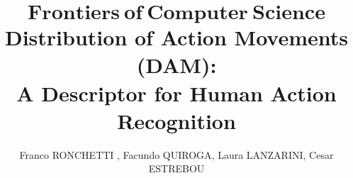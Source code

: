 \documentclass{fcs}
\title{$\bm{Frontiers~ of~ Computer~ Science}$\\[2mm] Distribution of Action Movements (DAM): \\A Descriptor for Human Action Recognition}
\author{Franco RONCHETTI \xff, Facundo QUIROGA, Laura LANZARINI, Cesar ESTREBOU}
\begin{document}
\maketitle
\setcounter{page}{1}
\setlength{\baselineskip}{14pt}


\newcommand{\as}{\mathcal{A}}

\newcommand{\ac}{\mathbf{A}}
\newcommand{\afj}{\mathbf{A}_{f,j}}
\newcommand{\aj}{\mathbf{A}_j}
\newcommand{\af}{\mathbf{A}_f}
\newcommand{\ai}{\mathbf{A}^i}
\newcommand{\aifj}{\mathbf{A}_{f,j}^i}
\newcommand{\aifjp}{\mathbf{A}_{f+1,j}^i}
\newcommand{\aifp}{\mathbf{A}_{f+1}^i}
\newcommand{\aij}{\mathbf{A}_j^i}
\newcommand{\aif}{\mathbf{A}_f^i}

\newcommand{\fri}{F_i}

\newcommand{\dc}{\mathbf{D}}
\newcommand{\dcj}{\mathbf{D}_j}
\newcommand{\df}{\mathbf{D}_f}
\newcommand{\dfj}{\mathbf{D}_{f,j}}

\newcommand{\di}{\mathbf{D}^i}
\newcommand{\dij}{\mathbf{D}_j^i}
\newcommand{\dif}{\mathbf{D}_f^i}
\newcommand{\difp}{\mathbf{D}_{f+1}^i}
\newcommand{\difw}{\mathbf{D}_{f+(w-1)}^i}
\newcommand{\difj}{\mathbf{D}_{f,j}^i}


\newcommand{\wc}{\mathbf{W}}
\newcommand{\wcj}{\mathbf{W}_j}
\newcommand{\wf}{\mathbf{W}_f}
\newcommand{\wfj}{\mathbf{W}_{f,j}}

\newcommand{\wi}{\mathbf{W}^i}
\newcommand{\wij}{\mathbf{W}_j^i}
\newcommand{\wif}{\mathbf{W}_f^i}
\newcommand{\wifj}{\mathbf{W}_{f,j}^i}


\newcommand{\wall}{\mathcal{W}^{all}}


\newcommand{\pca}{P(c | \ac)}
\newcommand{\pcaf}{P(c | \af)}

\newcommand{\pcw}{P( c | \wc)}
\newcommand{\pcwf}{P( c | \wf)}

\newcommand{\pccl}{P( c | \cl)}

\newcommand{\cw}{\mathcal{C}_w}
\newcommand{\ci}[1]{\mathbf{C}^{#1}}
\newcommand{\cl}{\ci{l}}

\newcommand{\fw}{F^W}



\newcommand{\hc}{\mathbf{H}}
\newcommand{\hl}{H_l}




\newcommand{\wrappingcaption}[1]{
\caption[asd]{\begin{minipage}[t]{.8\linewidth} 
#1 
\end{minipage}
}
}
\end{document}
